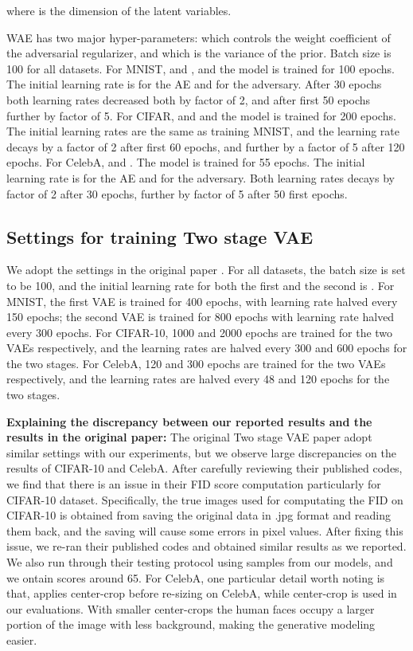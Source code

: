 \documentclass{article}
\begin{document}
where  is the dimension of the latent variables. 

WAE has two major hyper-parameters:  which controls the weight coefficient of the adversarial regularizer, and  which is the variance of the prior. Batch size is 100 for all datasets. For MNIST,  and , and the model is trained for 100 epochs. The initial learning rate is  for the AE and  for the adversary. After 30 epochs both learning rates decreased both by factor of 2, and after first 50 epochs further by factor of 5. For CIFAR,  and  and the model is trained for 200 epochs. The initial learning rates are the same as training MNIST, and the learning rate decays by a factor of 2 after first 60 epochs, and further by a factor of 5 after 120 epochs. For CelebA,  and . The model is trained for 55 epochs. The initial learning rate is  for the AE and  for the adversary. Both learning rates decays by factor of 2 after 30 epochs, further by factor of 5 after 50 first epochs.

\subsection{Settings for training Two stage VAE} \label{bug}
We adopt the settings in the original paper \citep{TwoVAE}. For all datasets, the batch size is set to be 100, and the initial learning rate for both the first and the second is . For MNIST, the first VAE is
trained for 400 epochs, with learning rate halved every 150 epochs; the second VAE is trained for 800 epochs with learning rate halved every 300 epochs. For CIFAR-10, 1000 and 2000 epochs are trained for the two VAEs respectively, and the learning rates are halved every 300 and 600 epochs for the two stages. For CelebA, 120 and 300 epochs are trained for the two VAEs respectively, and the learning rates are halved every 48 and 120 epochs for the two stages.

\textbf{Explaining the discrepancy between our reported results and the results in the original paper:} The original Two stage VAE paper adopt similar settings with our experiments, but we observe large discrepancies on the results of CIFAR-10 and CelebA. After carefully reviewing their published codes, we find that there is an issue in their FID score computation particularly for CIFAR-10 dataset. Specifically, the true images used for computating the FID on CIFAR-10 is obtained from saving the original data in .jpg format and reading them back, and the saving will cause some errors in pixel values. After fixing this issue, we re-ran their published codes and obtained similar results as we reported. We also run through their testing protocol using samples from our models, and we ontain scores around 65. For CelebA, one particular detail worth noting is that, \citep{TwoVAE} applies  center-crop before re-sizing on CelebA, while  center-crop is used in our evaluations. With smaller center-crops the human faces occupy a larger portion of the image with less background, making the generative modeling easier.
\end{document}
